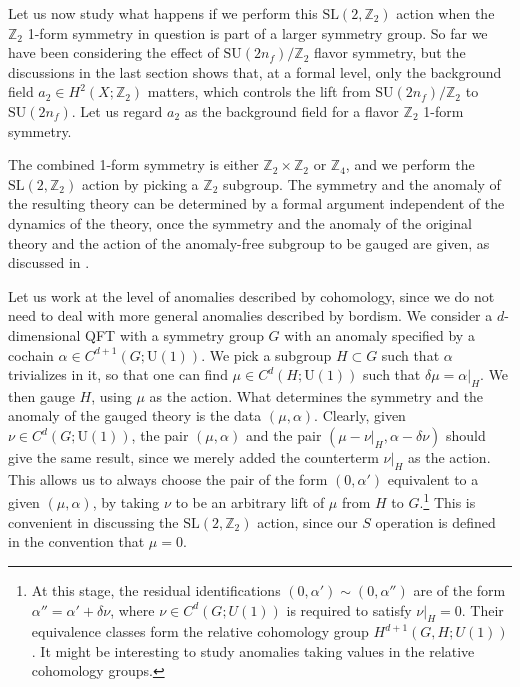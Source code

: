 \documentclass[12pt]{article}
\numberwithin{equation}{section}
\def\bZ{\mathbb{Z}}
\def\U{\mathrm{U}}
\def\SU{\mathrm{SU}}
\def\SL{\mathrm{SL}}
\begin{document}
Let us now study what happens if we perform this $\SL(2,\bZ_2)$ action when the $\bZ_2$ 1-form symmetry in question is part of a larger symmetry group.
So far we have been considering the effect of $\SU(2n_f)/\bZ_2$ flavor symmetry,
but the discussions in the last section shows that, at a formal level, only the background field $a_2 \in H^2(X;\bZ_2)$ matters, which controls the lift from $\SU(2n_f)/\bZ_2$ to $\SU(2n_f)$.
Let us regard $a_2$ as the background field for a flavor $\bZ_2$ 1-form symmetry.

The combined 1-form symmetry is either $\bZ_2\times \bZ_2$ or $\bZ_4$,
and we perform the $\SL(2,\bZ_2)$ action  by picking a $\bZ_2$ subgroup.
The symmetry and the anomaly of the resulting theory can be determined by a formal argument independent of the dynamics of the theory,
once the symmetry and the anomaly of the original theory 
and the action of the anomaly-free subgroup to be gauged are given, as discussed in \cite{Tachikawa:2017gyf}.

Let us work at the level of anomalies described by cohomology, since we do not need to deal with more general anomalies described by bordism.
We consider a $d$-dimensional QFT with a symmetry group $G$ with an anomaly specified by a cochain $\alpha\in C^{d+1}(G;\U(1))$. 
We pick a subgroup $H\subset G$ such that $\alpha$ trivializes in it, so that one can find $\mu \in C^d(H;\U(1))$ such that $\delta \mu = \alpha|_H$. 
We then gauge $H$, using $\mu$ as the action.
What determines the symmetry and the anomaly of the gauged theory is the data $(\mu,\alpha)$.
Clearly, given $\nu\in C^d(G;\U(1))$, the pair $(\mu,\alpha)$ and the pair $(\mu-\nu|_H,\alpha-\delta\nu)$ should give the same result, since we merely added the counterterm $\nu|_H$ as the action.
This allows us to always choose the pair of the form $(0,\alpha')$ equivalent to a given $(\mu,\alpha)$, 
by taking $\nu$ to be an arbitrary lift of $\mu$ from $H$ to $G$.\footnote{%
At this stage, the residual identifications $(0,\alpha')\sim (0,\alpha'')$ are of the form 
$\alpha''=\alpha'+\delta \nu$, where $\nu\in C^{d}(G;U(1))$ is required to satisfy $\nu|_H=0$.
Their equivalence classes form the relative cohomology group $H^{d+1}(G,H;U(1))$.
It might be interesting to study anomalies taking values in the relative cohomology groups.
}
This is convenient in discussing the $\SL(2,\bZ_2)$ action,
since our $S$ operation is defined in the convention that $\mu=0$.
\end{document}
